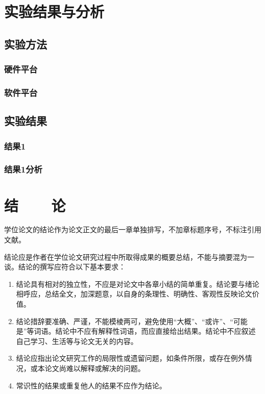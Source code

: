 \documentclass[forprint]{HedaBachelor}
\begin{document}
\chapter{实验结果与分析}

\section{实验方法}

\subsection{硬件平台}

\subsection{软件平台}

\section{实验结果}
\subsection{结果1}

\subsection{结果1分析}

\chapter*{结~~~~论} %

学位论文的结论作为论文正文的最后一章单独排写，不加章标题序号，不标注引用文献。

结论应是作者在学位论文研究过程中所取得成果的概要总结，不能与摘要混为一谈。结论的撰写应符合以下基本要求：
\begin{enumerate}
	\item 结论具有相对的独立性，不应是对论文中各章小结的简单重复。结论要与绪论相呼应，总结全文，加深题意，以自身的条理性、明确性、客观性反映论文价值。
	\item 结论措辞要准确、严谨，不能模棱两可，避免使用“大概”、“或许”、“可能是”等词语。结论中不应有解释性词语，而应直接给出结果。结论中不应叙述自己学习、生活等与论文无关的内容。
	\item 结论应指出论文研究工作的局限性或遗留问题，如条件所限，或存在例外情况，或本论文尚难以解释或解决的问题。
	\item 常识性的结果或重复他人的结果不应作为结论。
\end{enumerate}
\end{document}

